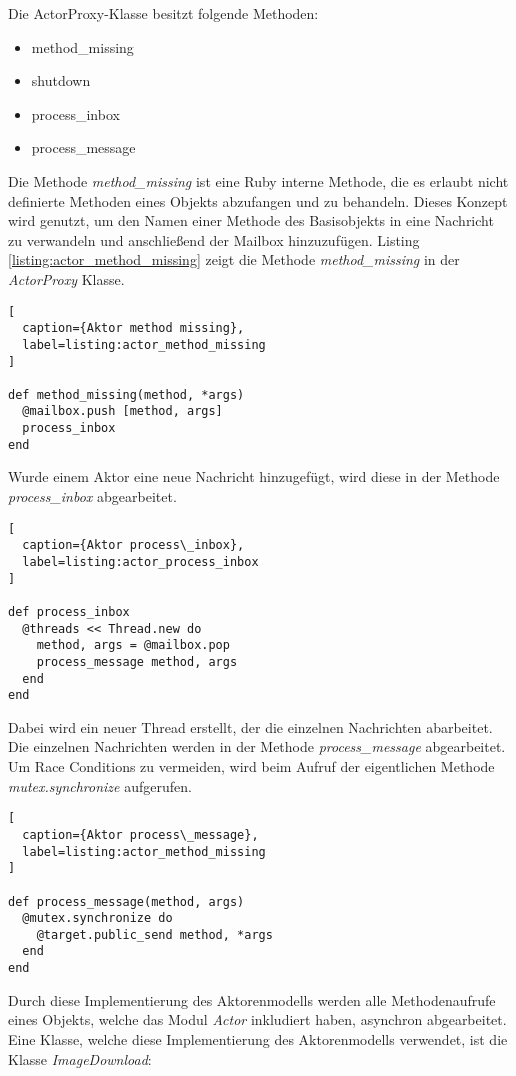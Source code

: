 Die ActorProxy-Klasse besitzt folgende Methoden:

\begin{itemize}
  \item method\_missing
  \item shutdown
  \item process\_inbox
  \item process\_message
\end{itemize}

Die Methode \emph{method\_missing} ist eine Ruby interne Methode, die es erlaubt nicht definierte Methoden eines Objekts abzufangen und zu behandeln. Dieses Konzept wird genutzt, um den Namen einer Methode des Basisobjekts in eine Nachricht zu verwandeln und anschließend der Mailbox hinzuzufügen. Listing \ref{listing:actor_method_missing} zeigt die Methode \emph{method\_missing} in der \emph{ActorProxy} Klasse. 

\begin{lstlisting}[
  caption={Aktor method missing},
  label=listing:actor_method_missing
]

def method_missing(method, *args)
  @mailbox.push [method, args]
  process_inbox
end
\end{lstlisting}

Wurde einem Aktor eine neue Nachricht hinzugefügt, wird diese in der Methode \emph{process\_inbox} abgearbeitet. 

\begin{lstlisting}[
  caption={Aktor process\_inbox},
  label=listing:actor_process_inbox
]

def process_inbox
  @threads << Thread.new do
    method, args = @mailbox.pop
    process_message method, args
  end
end
\end{lstlisting}  

Dabei wird ein neuer Thread erstellt, der die einzelnen Nachrichten abarbeitet. Die einzelnen Nachrichten werden in der Methode \emph{process\_message} abgearbeitet. Um Race Conditions zu vermeiden, wird beim Aufruf der eigentlichen Methode \emph{mutex.synchronize} aufgerufen. 


\begin{lstlisting}[
  caption={Aktor process\_message},
  label=listing:actor_method_missing
]

def process_message(method, args)
  @mutex.synchronize do
    @target.public_send method, *args
  end
end
\end{lstlisting}  

Durch diese Implementierung des Aktorenmodells werden alle Methodenaufrufe eines Objekts, welche das Modul \emph{Actor} inkludiert haben, asynchron abgearbeitet. Eine Klasse, welche diese Implementierung des Aktorenmodells verwendet, ist die Klasse \emph{ImageDownload}:

